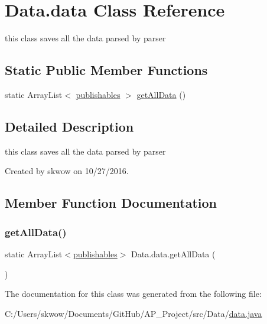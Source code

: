 \hypertarget{class_data_1_1data}{}\section{Data.\+data Class Reference}
\label{class_data_1_1data}


this class saves all the data parsed by parser  


\subsection*{Static Public Member Functions}
\begin{DoxyCompactItemize}
\item 
static Array\+List$<$ \hyperlink{class_data_1_1publishables}{publishables} $>$ \hyperlink{class_data_1_1data_adea6f2f27eedd673e6514f30ff4731e8}{get\+All\+Data} ()
\end{DoxyCompactItemize}


\subsection{Detailed Description}
this class saves all the data parsed by parser 

Created by skwow on 10/27/2016. 

\subsection{Member Function Documentation}
\hypertarget{class_data_1_1data_adea6f2f27eedd673e6514f30ff4731e8}{}\label{class_data_1_1data_adea6f2f27eedd673e6514f30ff4731e8} 
\subsubsection{\texorpdfstring{get\+All\+Data()}{getAllData()}}
{\footnotesize\ttfamily static Array\+List$<$\hyperlink{class_data_1_1publishables}{publishables}$>$ Data.\+data.\+get\+All\+Data (\begin{DoxyParamCaption}{ }\end{DoxyParamCaption})\hspace{0.3cm}{\ttfamily [static]}}



The documentation for this class was generated from the following file\+:\begin{DoxyCompactItemize}
\item 
C\+:/\+Users/skwow/\+Documents/\+Git\+Hub/\+A\+P\+\_\+\+Project/src/\+Data/\hyperlink{data_8java}{data.\+java}\end{DoxyCompactItemize}

